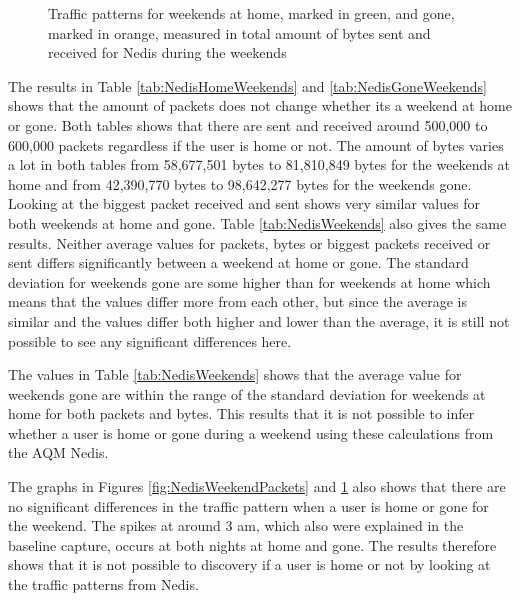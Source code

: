 \begin{figure}[H]
    \begin{subfigure}[b]{0.47\textwidth}
    \end{subfigure}
    \begin{subfigure}[b]{0.47\textwidth}
    \end{subfigure}
   \begin{subfigure}[b]{0.47\textwidth}
    \end{subfigure}
    \hspace{0.6cm}
    \begin{subfigure}[b]{0.47\textwidth}
    \end{subfigure}
  \caption{Traffic patterns for weekends at home, marked in green, and gone, marked in orange, measured in total amount of bytes sent and received for Nedis during the weekends}
    \label{fig:NedisWeekendBytes}
\end{figure}

The results in Table \ref{tab:NedisHomeWeekends} and \ref{tab:NedisGoneWeekends} shows that the amount of packets does not change whether its a weekend at home or gone. Both tables shows that there are sent and received around 500,000 to 600,000 packets regardless if the user is home or not. The amount of bytes varies a lot in both tables from 58,677,501 bytes to 81,810,849 bytes for the weekends at home and from 42,390,770 bytes to 98,642,277 bytes for the weekends gone. Looking at the biggest packet received and sent shows very similar values for both weekends at home and gone. Table \ref{tab:NedisWeekends} also gives the same results. Neither average values for packets, bytes or biggest packets received or sent differs significantly between a weekend at home or gone. The standard deviation for weekends gone are some higher than for weekends at home which means that the values differ more from each other, but since the average is similar and the values differ both higher and lower than the average, it is still not possible to see any significant differences here.

The values in Table \ref{tab:NedisWeekends} shows that the average value for weekends gone are within the range of the standard deviation for weekends at home for both packets and bytes. This results that it is not possible to infer whether a user is home or gone during a weekend using these calculations from the \gls{AQM} Nedis. 

The graphs in Figures \ref{fig:NedisWeekendPackets} and \ref{fig:NedisWeekendBytes} also shows that there are no significant differences in the traffic pattern when a user is home or gone for the weekend. The spikes at around 3 am, which also were explained in the baseline capture, occurs at both nights at home and gone. The results therefore shows that it is not possible to discovery if a user is home or not by looking at the traffic patterns from Nedis. 